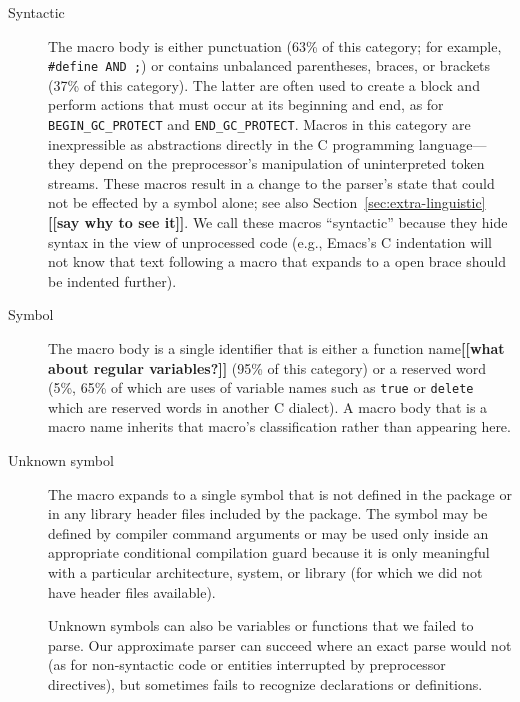 \documentclass[10pt]{article}
\newcommand{\comment}[1]{\textbf{[[#1]]}}
\begin{document}
\begin{description}
\item[Syntactic]  The macro body is either punctuation (63\% of this
  category; for example, {\tt \#define AND ;}) or contains unbalanced
  parentheses, braces, or brackets (37\% of this category).  The latter are
  often used to create a block and perform actions that must occur at its
  beginning and end, as for \verb|BEGIN_GC_PROTECT| and
  \verb|END_GC_PROTECT|.  Macros in this category are inexpressible as
  abstractions directly in the C programming language---they depend on the
  preprocessor's manipulation of uninterpreted token streams.  These macros
  result in a change to the parser's state that could not be effected by a
  symbol alone; see also Section~\ref{sec:extra-linguistic}\comment{say why
  to see it}.  We call these
  macros ``syntactic'' because they hide syntax in the view of unprocessed
  code (e.g., Emacs's C indentation will not know that text following a
  macro that expands to a open brace should be indented further).

\item[Symbol]
  The macro body is a single identifier that is either a function
  name\comment{what about regular variables?}
  (95\% of this category) or a reserved word (5\%, 65\% of which are uses
  of variable names such as {\tt true} or {\tt delete} which are reserved
  words in another C dialect).  A macro body that is a macro name inherits
  that macro's classification rather than appearing here.


\item[Unknown symbol]
  The macro expands to a single symbol that is not defined in the package
  or in any library header files included by the package.  The symbol may
  be defined by compiler command arguments or may be used only inside an
  appropriate conditional compilation guard because it is only meaningful
  with a particular architecture, system, or library (for which we did not
  have header files available).
  
  Unknown symbols can also be variables or functions that we failed to
  parse.  Our approximate parser can succeed where an exact parse would not
  (as for non-syntactic code or entities interrupted by preprocessor
  directives), but sometimes fails to recognize declarations or
  definitions.


\end{description}
\end{document}
